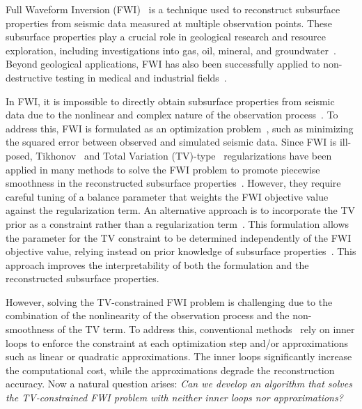 Full Waveform Inversion (FWI)~\cite{FWI0,FWI1} is a technique used to reconstruct subsurface properties from seismic data measured at multiple observation points.
These subsurface properties play a crucial role in geological research and resource exploration, including investigations into gas, oil, mineral, and groundwater~\cite{FWI1,FWIApplicationGroundwater0,FWIApplicationGroundwater1}.
Beyond geological applications, FWI has also been successfully applied to non-destructive testing in medical and industrial fields~\cite{FWIApplicationNonDestructiveTesting0,FWIApplicationNonDestructiveTesting1}.

In FWI, it is impossible to directly obtain subsurface properties from seismic data due to the nonlinear and complex nature of the observation process~\cite{FWI1}.
To address this, FWI is formulated as an optimization problem~\cite{FWI0,CustomFWI0,CustomFWI1,CustomFWI2,CustomFWI3,CustomFWI4,CustomFWI5}, such as minimizing the squared error between observed and simulated seismic data.
Since FWI is ill-posed, Tikhonov~\cite{tikhonov} and Total Variation (TV)-type~\cite{TV,TGV} regularizations have been applied in many methods to solve the FWI problem to promote piecewise smoothness in the reconstructed subsurface properties~\cite{FWI-with-tikhonov-regularization,FWI-with-TV-regularization,FWI-with-directional-TV-regularization,FWI-with-high-order-TV-regularization,FWI-with-TGV-regularization}.
However, they require careful tuning of a balance parameter that weights the FWI objective value against the regularization term.
An alternative approach is to incorporate the TV prior as a constraint rather than a regularization term~\cite{FWI-with-TV-constraint,FWI-with-TV-constraint2,FWI-with-TV-constraint3,FWI-with-TV-constraint4}.
This formulation allows the parameter for the TV constraint to be determined independently of the FWI objective value, relying instead on prior knowledge of subsurface properties~\mbox{\cite{constraint0,constraint1,constraint2,constraint3,constraint4,constraints-vs-penalties-in-FWI}}.
This approach improves the interpretability of both the formulation and the reconstructed subsurface properties.

However, solving the TV-constrained FWI problem is challenging due to the combination of the nonlinearity of the observation process and the non-smoothness of the TV term.
To address this, conventional methods~\cite{FWI-with-TV-constraint,FWI-with-TV-constraint2,FWI-with-TV-constraint3,FWI-with-TV-constraint4} rely on inner loops to enforce the constraint at each optimization step and/or approximations such as linear or quadratic approximations.
The inner loops significantly increase the computational cost, while the approximations degrade the reconstruction accuracy.
Now a natural question arises: \textit{Can we develop an algorithm that solves the TV-constrained FWI problem with neither inner loops nor approximations?}

